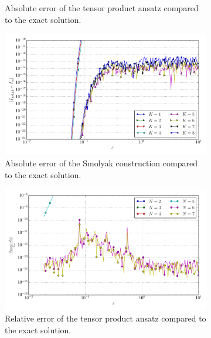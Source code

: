 \documentclass[a4paper,10pt]{article}
\begin{document}
\begin{figure}[ht!]
\begin{subfigure}[t]{0.5\linewidth}
    \caption{Absolute error of the tensor product ansatz compared to the exact solution.}
    \label{fig:tp_sg_6d_conv_p_500000_500000_err_nsd_tp}
  \end{subfigure}
  \begin{subfigure}[t]{0.5\linewidth}
    \includegraphics[width=\linewidth]{./plots/tp_sg_6d_conv_eps_(5,0,0,0,0,0)_(5,0,0,0,0,0)_err_nsd_gk.pdf}
    \caption{Absolute error of the Smolyak construction compared to the exact solution.}
    \label{fig:tp_sg_6d_conv_p_500000_500000_err_nsd_gk}
  \end{subfigure}
  \begin{subfigure}[t]{0.5\linewidth}
    \includegraphics[width=\linewidth]{./plots/tp_sg_6d_conv_eps_(5,0,0,0,0,0)_(5,0,0,0,0,0)_err_rel_nsd_tp.pdf}
    \caption{Relative error of the tensor product ansatz compared to the exact solution.}
    \label{fig:tp_sg_6d_conv_p_500000_500000_err_rel_nsd_tp}
  \end{subfigure}
  \begin{subfigure}[t]{0.5\linewidth}

\end{subfigure}
\end{figure}
\end{document}
